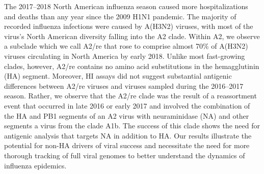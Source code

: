 The 2017--2018 North American influenza season caused more hospitalizations and deaths than any year since the 2009 H1N1 pandemic.
The majority of recorded influenza infections were caused by A(H3N2) viruses, with most of the virus's North American diversity falling into the A2 clade.
Within A2, we observe a subclade which we call A2/re that rose to comprise almost 70\% of A(H3N2) viruses circulating in North America by early 2018.
Unlike most fast-growing clades, however, A2/re contains no amino acid substitutions in the hemagglutinin (HA) segment.
Moreover, HI assays did not suggest substantial antigenic differences between A2/re viruses and viruses sampled during the 2016--2017 season.
Rather, we observe that the A2/re clade was the result of a reassortment event that occurred in late 2016 or early 2017 and involved the combination of the HA and PB1 segments of an A2 virus with neuraminidase (NA) and other segments a virus from the clade A1b.
The success of this clade shows the need for antigenic analysis that targets NA in addition to HA.
Our results illustrate the potential for non-HA drivers of viral success and necessitate the need for more thorough tracking of full viral genomes to better understand the dynamics of influenza epidemics.
